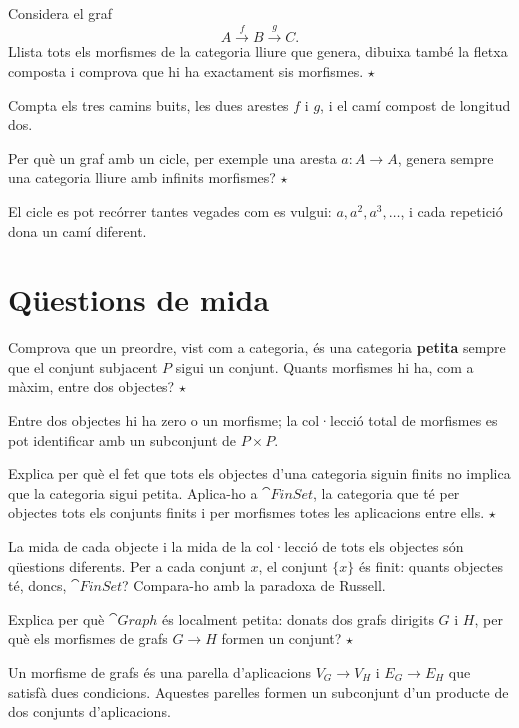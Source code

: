\begin{exercici}
Considera el graf
\[
A\xrightarrow{f}B\xrightarrow{g}C.
\]
Llista tots els morfismes de la categoria lliure que genera, dibuixa també la fletxa composta i comprova que hi ha exactament sis morfismes. \hfill{\normalfont$\star$}
\begin{indicacio}
Compta els tres camins buits, les dues arestes $f$ i $g$, i el camí compost de longitud dos.
\end{indicacio}
\end{exercici}

\begin{exercici}
Per què un graf amb un cicle, per exemple una aresta $a\colon A\to A$, genera sempre una categoria lliure amb infinits morfismes? \hfill{\normalfont$\star$}
\begin{indicacio}
El cicle es pot recórrer tantes vegades com es vulgui: $a,a^2,a^3,\ldots$, i cada repetició dona un camí diferent.
\end{indicacio}
\end{exercici}

\section{Qüestions de mida}

\begin{exercici}
Comprova que un preordre, vist com a categoria, és una categoria \textbf{petita} sempre que el conjunt subjacent $P$ sigui un conjunt. Quants morfismes hi ha, com a màxim, entre dos objectes? \hfill{\normalfont$\star$}
\begin{indicacio}
Entre dos objectes hi ha zero o un morfisme; la col·lecció total de morfismes es pot identificar amb un subconjunt de $P\times P$.
\end{indicacio}
\end{exercici}

\begin{exercici}
Explica per què el fet que tots els objectes d'una categoria siguin finits no implica que la categoria sigui petita. Aplica-ho a $\cat{FinSet}$, la categoria que té per objectes tots els conjunts finits i per morfismes totes les aplicacions entre ells. \hfill{\normalfont$\star$}
\begin{indicacio}
La mida de cada objecte i la mida de la col·lecció de tots els objectes són qüestions diferents. Per a cada conjunt $x$, el conjunt $\{x\}$ és finit: quants objectes té, doncs, $\cat{FinSet}$? Compara-ho amb la paradoxa de Russell.
\end{indicacio}
\end{exercici}

\begin{exercici}
Explica per què $\cat{Graph}$ és localment petita: donats dos grafs dirigits $G$ i $H$, per què els morfismes de grafs $G\to H$ formen un conjunt? \hfill{\normalfont$\star$}
\begin{indicacio}
Un morfisme de grafs és una parella d'aplicacions $V_G\to V_H$ i $E_G\to E_H$ que satisfà dues condicions. Aquestes parelles formen un subconjunt d'un producte de dos conjunts d'aplicacions.
\end{indicacio}
\end{exercici}
